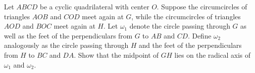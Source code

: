 Let $ABCD$ be a cyclic quadrilateral with center $O$.
Suppose the circumcircles of triangles $AOB$ and $COD$ meet again at $G$, while the circumcircles of triangles $AOD$ and $BOC$ meet again at $H$.
Let $\omega_1$ denote the circle passing through $G$ as well as the feet of the perpendiculars from $G$ to $AB$ and $CD$.
Define $\omega_2$ analogously as the circle passing through $H$ and the feet of the perpendiculars from $H$ to $BC$ and $DA$.
Show that the midpoint of $GH$ lies on the radical axis of $\omega_1$ and $\omega_2$.

